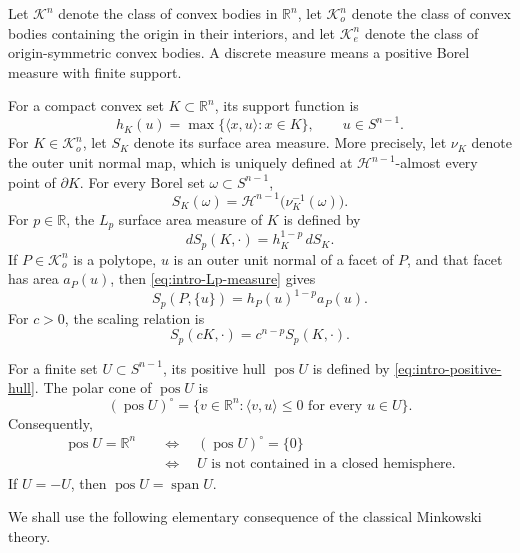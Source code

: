 \documentclass[12pt,reqno]{amsart}
\numberwithin{equation}{section}
\theoremstyle{remark}
\DeclareMathOperator{\pos}{pos}
\DeclareMathOperator{\spanop}{span}
\newcommand{\R}{\mathbb R}
\newcommand{\Kn}{\mathcal K^n}
\newcommand{\Koo}{\mathcal K_o^n}
\newcommand{\Kee}{\mathcal K_e^n}
\newcommand{\Haus}{\mathcal H}
\begin{document}
Let $\Kn$ denote the class of convex bodies in $\R^n$,
let $\Koo$ denote the class of convex bodies containing the
origin in their interiors, and let $\Kee$ denote the class of
origin-symmetric convex bodies.
A discrete measure means a positive Borel measure with finite
support.

For a compact convex set $K\subset\R^n$, its support function is
\begin{equation}
	h_K(u)=\max\{\langle x,u\rangle:x\in K\},
	\qquad u\in S^{n-1}.
\end{equation}
For $K\in\Koo$, let $S_K$ denote its surface area measure. More precisely, let $\nu_K$ denote the outer unit normal map,
which is uniquely defined at $\Haus^{n-1}$-almost every point
of $\partial K$. For every Borel set $\omega\subset S^{n-1}$,
\begin{equation}\label{eq:surface-area-measure}
	S_K(\omega)
	=
	\Haus^{n-1}\bigl(\nu_K^{-1}(\omega)\bigr).
\end{equation}
For $p\in\R$, the $L_p$ surface area measure of $K$ is defined by
\begin{equation}\label{eq:intro-Lp-measure}
	dS_p(K,\cdot)=h_K^{1-p}\,dS_K.
\end{equation}
If $P\in\Koo$ is a polytope, $u$ is an outer unit normal of a facet of $P$, and that facet has area $a_P(u)$, then \eqref{eq:intro-Lp-measure} gives
\begin{equation}\label{eq:polytope-Lp-mass}
 S_p(P,\{u\})=h_P(u)^{1-p}a_P(u).
\end{equation}
For $c>0$, the scaling relation is
\begin{equation}\label{eq:Lp-scaling}
 S_p(cK,\cdot)=c^{n-p}S_p(K,\cdot).
\end{equation}

For a finite set $U\subset S^{n-1}$, its positive hull $\pos U$ is defined by \eqref{eq:intro-positive-hull}. The polar cone of $\pos U$ is
\[
 (\pos U)^\circ
 =\{v\in\R^n:\langle v,u\rangle\leq0\text{ for every }u\in U\}.
\]
Consequently,
\begin{equation}\label{eq:positive-span-separation}
 \begin{aligned}
  \pos U=\R^n
  &\quad\Longleftrightarrow\quad (\pos U)^\circ=\{0\}\\
  &\quad\Longleftrightarrow\quad
  U\text{ is not contained in a closed hemisphere}.
 \end{aligned}
\end{equation}
If $U=-U$, then $\pos U=\spanop U$.

We shall  use the following elementary consequence of the classical Minkowski theory.
\end{document}
